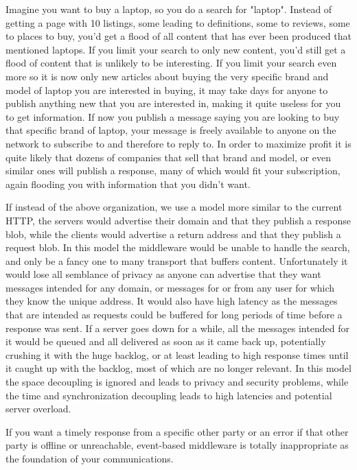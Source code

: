 \documentclass{acm_proc_article-sp}
\begin{document}
Imagine you want to buy a laptop, so you do a search for "laptop". Instead of getting a page with 10 listings, some leading to definitions, some to reviews, some to places to buy, you'd get a flood of all content that has ever been produced that mentioned laptops. If you limit your search to only new content, you'd still get a flood of content that is unlikely to be interesting. If you limit your search even more so it is now only new articles about buying the very specific brand and model of laptop you are interested in buying, it may take days for anyone to publish anything new that you are interested in, making it quite useless for you to get information. If now you publish a message saying you are looking to buy that specific brand of laptop, your message is freely available to anyone on the network to subscribe to and therefore to reply to. In order to maximize profit it is quite likely that dozens of companies that sell that brand and model, or even similar ones will publish a response, many of which would fit your subscription, again flooding you with information that you didn't want.

If instead of the above organization, we use a model more similar to the current HTTP, the servers would advertise their domain and that they publish a response blob, while the clients would advertise a return address and that they publish a request blob. In this model the middleware would be unable to handle the search, and only be a fancy one to many transport that buffers content. Unfortunately it would lose all semblance of privacy as anyone can advertise that they want messages intended for any domain, or messages for or from any user for which they know the unique address. It would also have high latency as the messages that are intended as requests could be buffered for long periods of time before a response was sent. If a server goes down for a while, all the messages intended for it would be queued and all delivered as soon as it came back up, potentially crushing it with the huge backlog, or at least leading to high response times until it caught up with the backlog, most of which are no longer relevant. In this model the space decoupling is ignored and leads to privacy and security problems, while the time and synchronization decoupling leads to high latencies and potential server overload.

If you want a timely response from a specific other party or an error if that other party is offline or unreachable, event-based middleware is totally inappropriate as the foundation of your communications.
\end{document}
